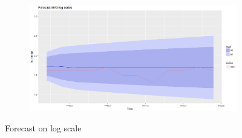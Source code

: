 \documentclass[12pt]{article}
\begin{document}
\begin{figure}[H]
\begin{subfigure}[b]{0.49\linewidth}
  \end{subfigure}
  \begin{subfigure}[b]{0.49\linewidth}
    \includegraphics[width=\linewidth]{figure13-4.png}
  \end{subfigure}
  \caption{Forecast on log scale}
  \label{fig:figure13}
\end{figure}
\end{document}
